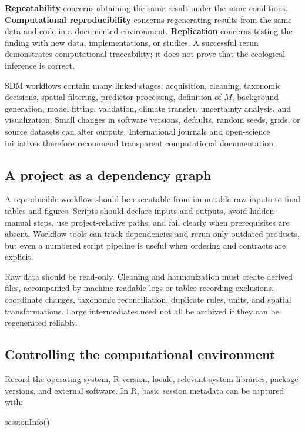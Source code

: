 \textbf{Repeatability} concerns obtaining the same result under the same conditions. \textbf{Computational reproducibility} concerns regenerating results from the same data and code in a documented environment. \textbf{Replication} concerns testing the finding with new data, implementations, or studies. A successful rerun demonstrates computational traceability; it does not prove that the ecological inference is correct.

SDM workflows contain many linked stages: acquisition, cleaning, taxonomic decisions, spatial filtering, predictor processing, definition of \(M\), background generation, model fitting, validation, climate transfer, uncertainty analysis, and visualization. Small changes in software versions, defaults, random seeds, grids, or source datasets can alter outputs. International journals and open-science initiatives therefore recommend transparent computational documentation \parencite{wilkinson2016fair,peng2011reproducible,sandve2013ten,zurell2020standard}.

\subsection{A project as a dependency graph}

A reproducible workflow should be executable from immutable raw inputs to final tables and figures. Scripts should declare inputs and outputs, avoid hidden manual steps, use project-relative paths, and fail clearly when prerequisites are absent. Workflow tools can track dependencies and rerun only outdated products, but even a numbered script pipeline is useful when ordering and contracts are explicit.

Raw data should be read-only. Cleaning and harmonization must create derived files, accompanied by machine-readable logs or tables recording exclusions, coordinate changes, taxonomic reconciliation, duplicate rules, units, and spatial transformations. Large intermediates need not all be archived if they can be regenerated reliably.

\subsection{Controlling the computational environment}

Record the operating system, R version, locale, relevant system libraries, package versions, and external software. In R, basic session metadata can be captured with:

\begin{rcode}
sessionInfo()
\end{rcode}

